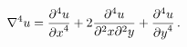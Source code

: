 \[\nabla^{4}u=\frac{{\partial}^{4}u}{{\partial x}^{4}}+2\frac{{\partial}^{4}u}{{%
\partial}^{2}x{\partial}^{2}y}+\frac{{\partial}^{4}u}{{\partial y}^{4}}\,.\]